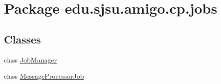\hypertarget{namespaceedu_1_1sjsu_1_1amigo_1_1cp_1_1jobs}{}\section{Package edu.\+sjsu.\+amigo.\+cp.\+jobs}
\label{namespaceedu_1_1sjsu_1_1amigo_1_1cp_1_1jobs}
\subsection*{Classes}
\begin{DoxyCompactItemize}
\item 
class \hyperlink{classedu_1_1sjsu_1_1amigo_1_1cp_1_1jobs_1_1_job_manager}{Job\+Manager}
\item 
class \hyperlink{classedu_1_1sjsu_1_1amigo_1_1cp_1_1jobs_1_1_message_processor_job}{Message\+Processor\+Job}
\end{DoxyCompactItemize}
